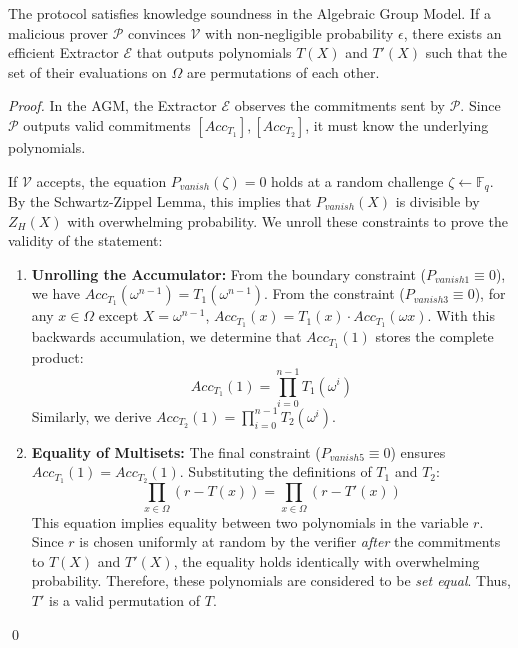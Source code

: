 \documentclass{llncs}
\begin{document}
\begin{theorem}
    The protocol satisfies knowledge soundness in the Algebraic Group Model. If a malicious prover ${\mathcal{P}}$ convinces $\mathcal{V}$ with non-negligible probability $\epsilon$, there exists an efficient Extractor $\mathcal{E}$ that outputs polynomials $T(X)$ and $T'(X)$ such that the set of their evaluations on $\Omega$ are permutations of each other.
\end{theorem}

\begin{proof}
    In the AGM, the Extractor $\mathcal{E}$ observes the commitments sent by ${\mathcal{P}}$. Since ${\mathcal{P}}$ outputs valid commitments $[Acc_{T_1}], [Acc_{T_2}]$, it must know the underlying polynomials.
    
    If $\mathcal{V}$ accepts, the equation $P_{vanish}(\zeta) = 0$ holds at a random challenge $\zeta \leftarrow \mathbb{F}_q$. By the Schwartz-Zippel Lemma, this implies that $P_{vanish}(X)$ is divisible by $Z_H(X)$ with overwhelming probability. 
    We unroll these constraints to prove the validity of the statement:

    \begin{enumerate}
        \item \textbf{Unrolling the Accumulator:}
        From the boundary constraint ($P_{vanish1} \equiv 0$), we have $Acc_{T_1}(\omega^{n-1}) = T_1(\omega^{n-1})$.
        From the constraint ($P_{vanish3} \equiv 0$), for any $x \in \Omega$ except $X= \omega^{n-1}$, $Acc_{T_1}(x) = T_1(x) \cdot Acc_{T_1}(\omega x)$.
        With this backwards accumulation, we determine that $Acc_{T_1}(1)$ stores the complete product:
        \begin{equation}
            Acc_{T_1}(1) = \prod_{i=0}^{n-1} T_1(\omega^i)
        \end{equation}
        Similarly, we derive $Acc_{T_2}(1) = \prod_{i=0}^{n-1} T_2(\omega^i)$.

        \item \textbf{Equality of Multisets:}
        The final constraint ($P_{vanish5} \equiv 0$) ensures $Acc_{T_1}(1) = Acc_{T_2}(1)$. Substituting the definitions of $T_1$ and $T_2$:
        \begin{equation}
            \prod_{x \in \Omega} (r - T(x)) = \prod_{x \in \Omega} (r - T'(x))
        \end{equation}
        This equation implies equality between two polynomials in the variable $r$. Since $r$ is chosen uniformly at random by the verifier \emph{after} the commitments to $T(X)$ and $T'(X)$, the equality holds identically with overwhelming probability. 
        Therefore, these polynomials are considered to be \emph{set equal}. Thus, $T'$ is a valid permutation of $T$.
    \end{enumerate}
    \qed
\end{proof}
\end{document}
